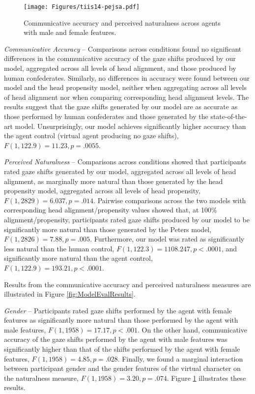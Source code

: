 \begin{figure}[t]
  \centering
  \texttt{[image: Figures/tiis14-pejsa.pdf]}
  \caption{Communicative accuracy and perceived naturalness across agents with male and female features.}
  \label{fig:ModelEvalResultsGender}
\end{figure}

\emph{Communicative Accuracy} -- Comparisons across conditions found no significant differences in the communicative accuracy of the gaze shifts produced by our model, aggregated across all levels of head alignment, and those produced by human confederates. Similarly, no differences in accuracy were found between our model and the head propensity model, neither when aggregating across all levels of head alignment nor when comparing corresponding head alignment levels. The results suggest that the gaze shifts generated by our model are as accurate as those performed by human confederates and those generated by the state-of-the-art model. Unsurprisingly, our model achieves significantly higher accuracy than the agent control (virtual agent producing no gaze shifts), $F(1, 122.9) = 11.23, p = .0055$.

\emph{Perceived Naturalness} -- Comparisons across conditions showed that participants rated gaze shifts generated by our model, aggregated across all levels of head alignment, as marginally more natural than those generated by the head propensity model, aggregated across all levels of head propensity, $F(1, 2829) = 6.037, p = .014$. Pairwise comparisons across the two models with corresponding head alignment/propensity values showed that, at 100\% alignment/propensity, participants rated gaze shifts produced by our model to be significantly more natural than those generated by the Peters model, $F(1, 2826) = 7.88, p = .005$. Furthermore, our model was rated as significantly less natural than the human control, $F(1, 122.3) = 1108.247, p < .0001$, and significantly more natural than the agent control, $F(1, 122.9) = 193.21, p < .0001$.

Results from the communicative accuracy and perceived naturalness measures are illustrated in Figure \ref{fig:ModelEvalResults}.

\emph{Gender} -- Participants rated gaze shifts performed by the agent with female features as significantly more natural than those performed by the agent with male features, $F(1, 1958) = 17.17, p < .001$. On the other hand, communicative accuracy of the gaze shifts performed by the agent with male features was significantly higher than that of the shifts performed by the agent with female features, $F(1, 1958) = 4.85, p = .028$. Finally, we found a marginal interaction between participant gender and the gender features of the virtual character on the naturalness measure, $F(1, 1958) = 3.20, p = .074$. Figure \ref{fig:ModelEvalResultsGender} illustrates these results.

